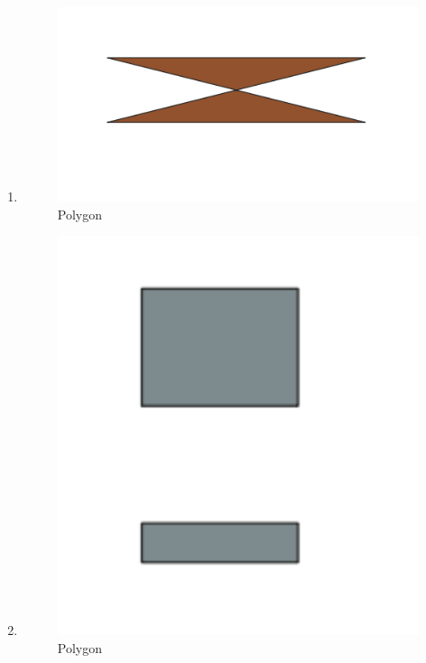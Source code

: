 \begin{enumerate}
	\item 
	
	\begin{figure}[H]
		\includegraphics[width=12cm]{figures/1174050/8.PNG}
		\centering
		\caption{Polygon}
	\end{figure}
	
	\item 
	
	\begin{figure}[H]
		\includegraphics[width=12cm]{figures/1174050/9.PNG}
		\centering
		\caption{Polygon}
	\end{figure}
	

\end{enumerate}
